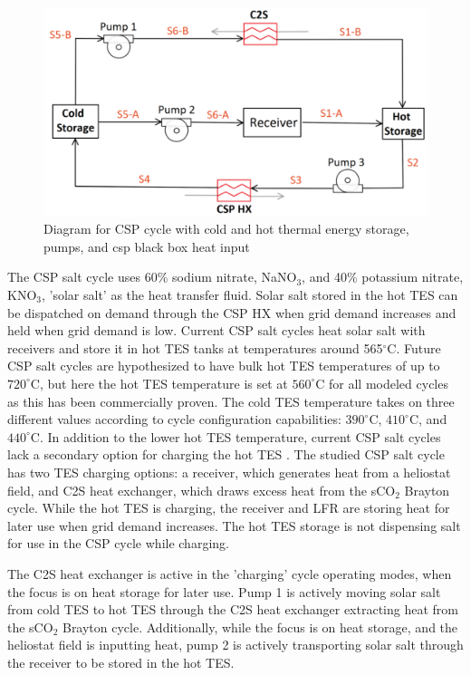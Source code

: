 \begin{figure}[h] 
    \widefigure
    \includegraphics[width=10 cm]{Definitions/csp.pdf}
    \caption{Diagram for CSP cycle with cold and hot thermal energy storage, pumps, and csp black box heat input\label{csp}}
\end{figure}

The CSP salt cycle uses 60\% sodium nitrate, NaNO$_3$, and 40\% potassium nitrate, KNO$_3$, 'solar salt' as the heat transfer fluid. Solar salt stored in the hot TES can be dispatched on demand through the CSP HX when grid demand increases and held when grid demand is low. Current CSP salt cycles heat solar salt with receivers and store it in hot TES tanks at temperatures around 565$^{\circ}$C. Future CSP salt cycles are hypothesized to have bulk hot TES temperatures of up to $720^{\circ}$C, but here the hot TES temperature is set at $560^{\circ}$C for all modeled cycles \cite{mehos2017concentrating} as this has been commercially proven. The cold TES temperature takes on three different values according to cycle configuration capabilities: $390^{\circ}$C, $410^{\circ}$C, and $440^{\circ}$C. In addition to the lower hot TES temperature, current CSP salt cycles lack a secondary option for charging the hot TES \cite{hamilton2020dispatch}. The studied CSP salt cycle has two TES charging options: a receiver, which generates heat from a heliostat field, and C2S heat exchanger, which draws excess heat from the sCO$_2$ Brayton cycle. While the hot TES is charging, the receiver and LFR are storing heat for later use when grid demand increases. The hot TES storage is not dispensing salt for use in the CSP cycle while charging.

The C2S heat exchanger is active in the 'charging' cycle operating modes, when the focus is on heat storage for later use. Pump 1 is actively moving solar salt from cold TES to hot TES through the C2S heat exchanger extracting heat from the sCO$_2$ Brayton cycle. Additionally, while the focus is on heat storage, and the heliostat field is inputting heat, pump 2 is actively transporting solar salt through the receiver to be stored in the hot TES.

